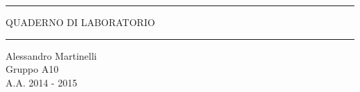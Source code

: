 \begin{titlepage}
\begin{center}

	\hrule \vspace{0.5cm}
     	\textsc{\LARGE QUADERNO DI LABORATORIO}
	\vspace{0.5cm} \hrule \vspace{2cm}

      	{\large Alessandro Martinelli\\
		Gruppo A10}\\
	\vspace{0.5cm}
      	{\large A.A. 2014 - 2015}
	\vfill



\end{center}
\end{titlepage}
